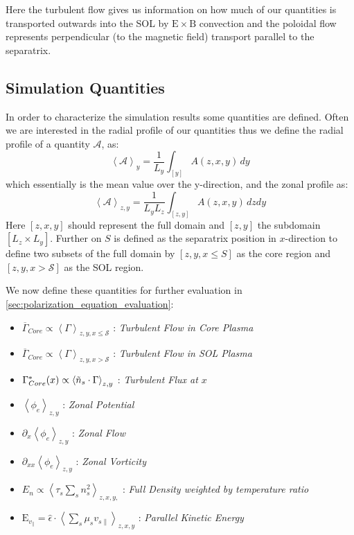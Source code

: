 \documentclass[master.tex]{subfiles}
\newcommand{\meanxy}[1]{\left<#1\right>_{z,y}}
\begin{document}
Here the turbulent flow gives us information on how much of our quantities is transported outwards into the \ac{SOL} by $\mathrm{E}\times\mathrm{B}$ convection and the poloidal flow represents perpendicular (to the magnetic field) transport parallel to the separatrix.

\subsection{Simulation Quantities}\label{sec:simulation_quantities}



In order to characterize the simulation results some quantities are defined. Often we are interested in the radial profile of our quantities thus we define the radial profile of a quantity $\mathcal{A}$, as:
\begin{equation}
    \left<\mathcal{A}\right>_y = \frac{1}{L_y} \int_{[y]} A(z,x,y) \, dy
\end{equation}
which essentially is the mean value over the y-direction,
and the zonal profile as:
\begin{equation}
    \left<\mathcal{A}\right>_{z, y} =\frac{1}{L_yL_z} \int_{[z, y]} A(z,x,y) \, dzdy
\end{equation}
Here $[z,x,y]$ should represent the full domain and $[z,y]$ the subdomain $[L_z \times L_y]$. Further on $S$ is defined as the separatrix position in $x$-direction to define two subsets of the full domain by $[z,y,x\leq S]$ as the core region and $[z,y,x > \mathcal{S}]$ as the \ac{SOL} region.



We now define these quantities for further evaluation in \autoref{sec:polarization_equation_evaluation}:

\begin{itemize}
    \item $\overline{\Gamma}_{Core} \propto  \left<\Gamma\right>_{z,y, x \leq \mathcal{S}}$ : \textit{Turbulent Flow in Core Plasma}
    \item  $\overline{\Gamma}_{Core} \propto  \left<\Gamma\right>_{z,y, x > \mathcal{S}}$ : \textit{Turbulent Flow in \ac{SOL} Plasma}
    \item $\Gamma_{Core}^*(x) \propto \left<\Tilde{n}_s \cdot \Gamma\right>_{z,y}$ : \textit{Turbulent Flux at $x$}
    \item $\meanxy{\phi_e}$ : \textit{Zonal Potential}
    \item $\partial_x \meanxy{\phi_e}$ : \textit{Zonal Flow}
    \item $\partial_{xx}\meanxy{\phi_e}$ : \textit{Zonal Vorticity}
    \item $E_n \propto \left< \tau_s \sum_s n_s^2 \right>_{z, x, y,}$ : \textit{Full Density weighted by temperature ratio}
    \item $\mathrm{E}_{v_\parallel} = \hat{\epsilon} \cdot \left<\sum_s \mu_s v_{s\parallel} \right>_{z, x, y}$ : \textit{Parallel Kinetic Energy}
\end{itemize}
\end{document}
